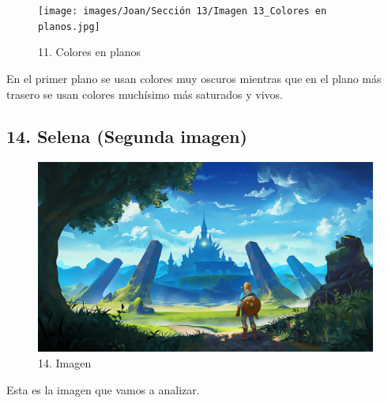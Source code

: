\documentclass[12pt]{article}
\begin{document}
        \begin{figure}[H]
          \centering
          \texttt{[image: images/Joan/Sección 13/Imagen 13\_Colores en planos.jpg]}
          \caption{\small 11. Colores en planos}
        \end{figure}

        En el primer plano se usan colores muy oscuros mientras que en el plano más trasero se usan colores muchísimo más saturados y vivos. 

\newpage


    \subsection{14. Selena (Segunda imagen)}
    \begin{figure}[H]
      \centering
      \includegraphics[scale=0.35]{images/Selena/14_concept_art.jpg}
      \caption{\small 14. Imagen}
    \end{figure}

    Esta es la imagen que vamos a analizar.
\end{document}
